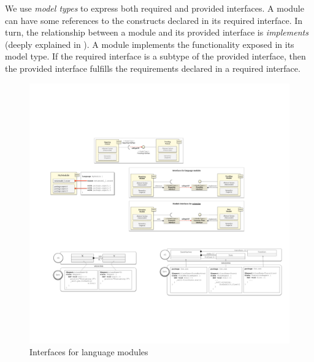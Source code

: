 We use \textit{model types} \cite{Steel:2007} to express both required and provided interfaces. A module can have some references to the constructs declared in its required interface. In turn, the relationship between a module and its provided interface is \textit{implements} (deeply explained in \cite{Degueule:2015}). A module implements the functionality exposed in its model type. If the required interface is a subtype of the provided interface, then the provided interface fulfills the requirements declared in a required interface. 

\begin{figure}
\centering
\includegraphics[width=1\linewidth]{images/approach-interfaces.pdf}
\caption{Interfaces for language modules}
\label{fig:approaches-interfaces}
\end{figure}
\vspace{-3mm}
